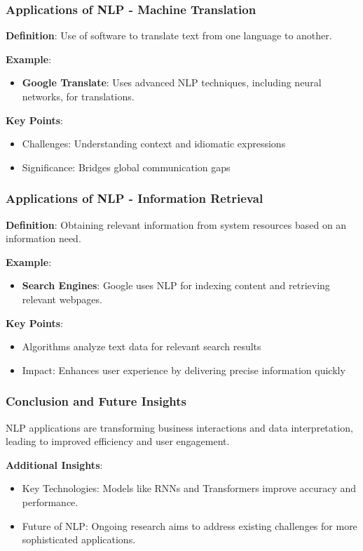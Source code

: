 \documentclass[aspectratio=169]{beamer}
\begin{document}
\begin{frame}[fragile]
    \frametitle{Applications of NLP - Machine Translation}
    \textbf{Definition}: Use of software to translate text from one language to another.

    \textbf{Example}:
    \begin{itemize}
        \item \textbf{Google Translate}: Uses advanced NLP techniques, including neural networks, for translations.
    \end{itemize}

    \textbf{Key Points}:
    \begin{itemize}
        \item Challenges: Understanding context and idiomatic expressions
        \item Significance: Bridges global communication gaps
    \end{itemize}
\end{frame}

\begin{frame}[fragile]
    \frametitle{Applications of NLP - Information Retrieval}
    \textbf{Definition}: Obtaining relevant information from system resources based on an information need.

    \textbf{Example}:
    \begin{itemize}
        \item \textbf{Search Engines}: Google uses NLP for indexing content and retrieving relevant webpages.
    \end{itemize}

    \textbf{Key Points}:
    \begin{itemize}
        \item Algorithms analyze text data for relevant search results
        \item Impact: Enhances user experience by delivering precise information quickly
    \end{itemize}
\end{frame}

\begin{frame}[fragile]
    \frametitle{Conclusion and Future Insights}
    NLP applications are transforming business interactions and data interpretation, leading to improved efficiency and user engagement.

    \textbf{Additional Insights}:
    \begin{itemize}
        \item Key Technologies: Models like RNNs and Transformers improve accuracy and performance.
        \item Future of NLP: Ongoing research aims to address existing challenges for more sophisticated applications.
    \end{itemize}
\end{frame}
\end{document}
